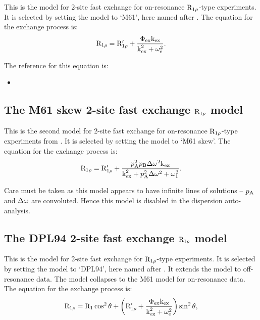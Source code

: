 This is the model for 2-site fast exchange for on-resonance $\mathrm{R}_{1\rho}$-type experiments.  It is selected by setting the model to `M61', here named after \citet{Meiboom61}.  The equation for the exchange process is:
\begin{equation}
    \mathrm{R}_{1\rho} = \mathrm{R}_{1\rho}' + \frac{\Phi_\textrm{ex}\textrm{k}_\textrm{ex}}{\textrm{k}_\textrm{ex}^2 + \omega_\textrm{e}^2} .
\end{equation}

The reference for this equation is:
\begin{itemize}
\item {}
\end{itemize}



\subsection{The M61 skew 2-site fast exchange $\mathrm{R}_{1\rho}$ model}
\label{sect: dispersion: M61 skew model}

This is the second model for 2-site fast exchange for on-resonance $\mathrm{R}_{1\rho}$-type experiments from \citet{Meiboom61}.  It is selected by setting the model to `M61 skew'.  The equation for the exchange process is:
\begin{equation}
    \mathrm{R}_{1\rho} = \mathrm{R}_{1\rho}' + \frac{p_\textrm{A}^2p_\textrm{B}\Delta\omega^2\textrm{k}_\textrm{ex}}{\textrm{k}_\textrm{ex}^2 + p_\textrm{A}^2\Delta\omega^2 + \omega_1^2} .
\end{equation}

Care must be taken as this model appears to have infinite lines of solutions -- $p_\textrm{A}$ and $\Delta\omega$ are convoluted.  Hence this model is disabled in the dispersion auto-analysis.



\subsection{The DPL94 2-site fast exchange $\mathrm{R}_{1\rho}$ model}
\label{sect: dispersion: DPL94 model}

This is the model for 2-site fast exchange for $\mathrm{R}_{1\rho}$-type experiments.  It is selected by setting the model to `DPL94', here named after \citet{Davis94}.  It extends the \citet{Meiboom61} model to off-resonance data.  The model collapses to the M61 model for on-resonance data.  The equation for the exchange process is:
\begin{equation}
    \mathrm{R}_{1\rho} = \mathrm{R}_1 \cos^2\theta  +  \left( \mathrm{R}_{1\rho}' + \frac{\Phi_\textrm{ex}\textrm{k}_\textrm{ex}}{\textrm{k}_\textrm{ex}^2 + \omega_\textrm{e}^2} \right) \sin^2\theta ,
\end{equation}

